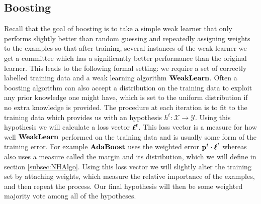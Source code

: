 \subsection{Boosting}
\label{subsec:boosting}
Recall that the goal of boosting is to take a simple weak learner that only performs slightly better than random guessing and repeatedly assigning weights to the examples so that after training, several instances of the weak learner we get a committee which has a significantly better performance than the original learner.
This leads to the following formal setting: we require a set of correctly labelled training data and a weak learning algorithm $\textbf{WeakLearn}$. Often a boosting algorithm can also accept a distribution on the training data to exploit any prior knowledge one might have, which is set to the uniform distribution if no extra knowledge is provided. The procedure at each iteration is to fit \weak to the training data which provides us with an hypothesis $h^t:\mathcal X \to \mathcal Y$. Using this hypothesis we will calculate a loss vector $\boldsymbol\ell^t$. This loss vector is a measure for how well $\textbf{WeakLearn}$ performed on the training data and is usually some form of the training error. For example $\textbf{AdaBoost}$ uses the weighted error $\mathbf{p}^t\cdot\boldsymbol\ell^t$ whereas \NHB also uses a measure called the margin and its distribution, which we will define in section \ref{subsec:NHAlgo}. Using this loss vector we will slightly alter the training set by attaching weights, which measure the relative importance of the examples, and then repeat the process. Our final hypothesis will then be some weighted majority vote among all of the hypotheses. 

\section{\adaB}
\label{sec:ada}

